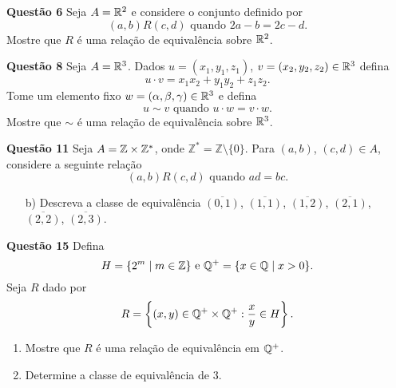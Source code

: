 \documentclass[12pt]{exam}
\begin{document}
    \noindent \textbf{Questão 6}
    Seja $A = \mathbb{R}^2$ e considere o conjunto definido por
    \[
      (a,b)R(c,d) \mbox{ quando } 2a - b = 2c - d.
    \]
    Mostre que $R$ \'e uma rela\c{c}\~ao de equival\^encia sobre $\mathbb{R}^2$.
    
    \vspace{.3cm}

    \noindent \textbf{Questão 8}
    Seja $A = \mathbb{R}^3$. Dados $u = (x_1, y_1, z_1)$, $v = (x_2, y_2, z_2) \in \mathbb{R}^3$ defina
    \[
        u\cdot v = x_1x_2 + y_1y_2 + z_1z_2.
    \]
    Tome um elemento fixo $w = (\alpha, \beta, \gamma) \in \mathbb{R}^3$ e defina
    \[
        u \sim v \mbox{ quando } u \cdot w = v \cdot w.
    \]
    Mostre que $\sim$ \'e uma rela\c{c}\~ao de equival\^encia sobre $\mathbb{R}^3$.
    
    \vspace{.3cm}
    
    \noindent \textbf{Questão 11}
    Seja $A = \mathbb{Z} \times \mathbb{Z}^*$, onde $\mathbb{Z}^* = \mathbb{Z} \setminus \{0\}$. Para $(a,b)$, $(c,d) \in A$, considere a seguinte rela{\c c}{\~a}o
    \[
        (a,b) R (c,d) \mbox{ quando } ad = bc.
    \]
    \begin{enumerate}
        \item[b)] Descreva a classe de equival{\^e}ncia $\overline{(0,1)}$, $\overline{(1,1)}$, $\overline{(1,2)}$, $\overline{(2,1)}$, $\overline{(2,2)}$, $\overline{(2,3)}$.
    \end{enumerate}

    \vspace{.3cm}

    \noindent \textbf{Questão 15}
    Defina
    \[
        H = \{2^m \mid m \in \mathbb{Z}\} \mbox{ e } \mathbb{Q}^+ = \{x \in \mathbb{Q} \mid x > 0\}.
    \]
    Seja $R$ dado por
    \[
        R = \left\{(x,y) \in \mathbb{Q}^+\times \mathbb{Q}^+ : \frac{x}{y} \in H\right\}.
    \]
    \begin{enumerate}[label={\alph*})]
        \item Mostre que $R$ \'e uma rela\c{c}\~ao de equival\^encia em $\mathbb{Q}^+$.
        \item Determine a classe de equival\^encia de $3$.
    \end{enumerate}
    
\end{document}
